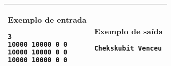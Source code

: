 \begin{table}[!h]
\centering
\begin{tabular}{|l|l|}
\hline
\begin{minipage}[t]{2.5in}
\textbf{Exemplo de entrada}
\begin{verbatim}
3
10000 10000 0 0
10000 10000 0 0
10000 10000 0 0
\end{verbatim}
\vspace{1mm}
\end{minipage}
&
\begin{minipage}[t]{2.5in}
\textbf{Exemplo de saída}
\begin{verbatim}
Chekskubit Venceu
\end{verbatim}
\vspace{1mm}
\end{minipage} \\
\hline
\end{tabular}
\end{table}
